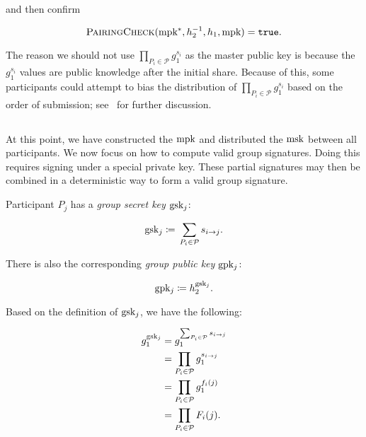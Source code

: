 \noindent
and then confirm

\begin{equation}
    \textsc{PairingCheck}{}(\textrm{mpk}{}^{*},h_{2}^{-1},h_{1},\textrm{mpk}{}) = \texttt{true}.
\end{equation}

The reason we should not use $\prod_{P_{i}\in\mathcal{P}} g_{1}^{s_{i}}$
as the master public key is because the $g_{1}^{s_{i}}$ values
are public knowledge after the initial share.
Because of this, some participants could attempt to bias the distribution
of $\prod_{P_{i}\in\mathcal{P}} g_{1}^{s_{i}}$ based on the order
of submission;
see~\cite{gennaro1999secure,gennaro2002revisiting} for further discussion.


\subsection{\GPKSubmission{}}
\label{ssec:secret_dkg_gpk_submission}

At this point, we have constructed the $\textrm{mpk}{}$ and distributed
the $\textrm{msk}{}$ between all participants.
We now focus on how to compute valid group signatures.
Doing this requires signing under a special private key.
These partial signatures may then be combined in a deterministic
way to form a valid group signature.

Participant $P_{j}$ has a \emph{group secret key} $\textrm{gsk}{}_{j}$:

\begin{equation}
    \textrm{gsk}{}_{j} \coloneqq{} \sum_{P_{i}\in\mathcal{P}} s_{i\to j}.
    \label{eq:dkg_gskj_def}
\end{equation}

\noindent
There is also the corresponding \emph{group public key} $\textrm{gpk}{}_{j}$:

\begin{equation}
    \textrm{gpk}{}_{j} \coloneqq{} h_{2}^{\textrm{gsk}{}_{j}}.
\end{equation}

\noindent
Based on the definition of $\textrm{gsk}{}_{j}$, we have the following:

\begin{align}
    g_{1}^{\textrm{gsk}{}_{j}} &= g_{1}^{\sum_{P_{i}\in\mathcal{P}} s_{i\to j}}
        \nonumber\\
    &= \prod_{P_{i}\in\mathcal{P}} g_{1}^{s_{i\to j}}
        \nonumber\\
    &= \prod_{P_{i}\in\mathcal{P}} g_{1}^{f_{i}(j)}
        \nonumber\\
    &= \prod_{P_{i}\in\mathcal{P}} F_{i}(j).
    \label{eq:dkg_gpkj_star_derivation}
\end{align}

